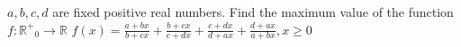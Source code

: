 $a,b,c,d$ are fixed positive real numbers. Find the maximum value of the function $f: \mathbb{R^{+}}_{0}  \rightarrow \mathbb{R}$ $f(x)=\frac{a+bx}{b+cx}+\frac{b+cx}{c+dx}+\frac{c+dx}{d+ax}+\frac{d+ax}{a+bx}, x \geq 0$